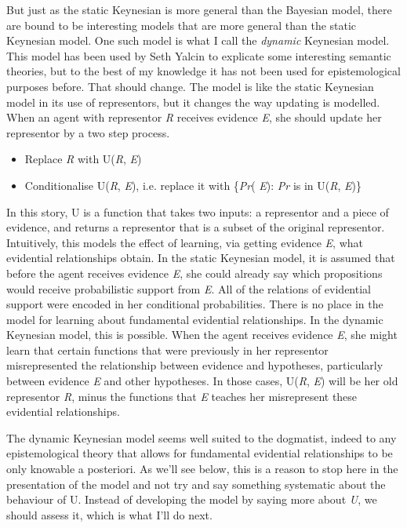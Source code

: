 But just as the static Keynesian is more general than the Bayesian model, there are bound to be interesting models that are more general than the static Keynesian model. One such model is what I call the \textit{dynamic} Keynesian model. This model has been used by Seth Yalcin to explicate some interesting semantic theories, but to the best of my knowledge it has not been used for epistemological purposes before. That should change. The model is like the static Keynesian model in its use of representors, but it changes the way updating is modelled. When an agent with representor \textit{R} receives evidence \textit{E}, she should update her representor by a two step process.

\begin{itemize}
\item Replace \textit{R} with U(\textit{R}, \textit{E})
\item Conditionalise U(\textit{R}, \textit{E}), i.e. replace it with \{\textit{Pr}({\textbullet} {\textbar} \textit{E}): \textit{Pr} is in U(\textit{R}, \textit{E})\}
\end{itemize}

\noindent In this story, U is a function that takes two inputs: a representor and a piece of evidence, and returns a representor that is a subset of the original representor. Intuitively, this models the effect of learning, via getting evidence \textit{E}, what evidential relationships obtain. In the static Keynesian model, it is assumed that before the agent receives evidence \textit{E}, she could already say which propositions would receive probabilistic support from \textit{E}. All of the relations of evidential support were encoded in her conditional probabilities. There is no place in the model for learning about fundamental evidential relationships. In the dynamic Keynesian model, this is possible. When the agent receives evidence \textit{E}, she might learn that certain functions that were previously in her representor misrepresented the relationship between evidence and hypotheses, particularly between evidence \textit{E} and other hypotheses. In those cases, U(\textit{R}, \textit{E}) will be her old representor \textit{R}, minus the functions that \textit{E} teaches her misrepresent these evidential relationships.

The dynamic Keynesian model seems well suited to the dogmatist, indeed to any epistemological theory that allows for fundamental evidential relationships to be only knowable a posteriori. As we'll see below, this is a reason to stop here in the presentation of the model and not try and say something systematic about the behaviour of U. Instead of developing the model by saying more about \textit{U}, we should assess it, which is what I'll do next.


